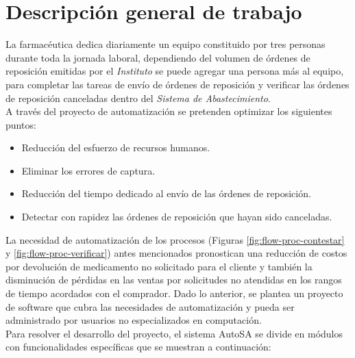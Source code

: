\section{Descripción general de trabajo}\label{sec:desc-general}
La farmacéutica dedica diariamente un equipo constituido por tres personas durante toda la jornada laboral, dependiendo del volumen de órdenes de reposición emitidas por el \textit{Instituto} se puede agregar una persona más al equipo, para completar las tareas de envío de órdenes de reposición y verificar las órdenes de reposición canceladas dentro del \textit{Sistema de Abastecimiento}.\\
A través del proyecto de automatización se pretenden optimizar los siguientes puntos:
\begin{itemize}
\item Reducción del esfuerzo de recursos humanos.
\item Eliminar los errores de captura.
\item Reducción del tiempo dedicado al envío de las órdenes de reposición.
\item Detectar con rapidez las órdenes de reposición que hayan sido canceladas.
\end{itemize}
La necesidad de automatización de los procesos (Figuras \ref{fig:flow-proc-contestar} y \ref{fig:flow-proc-verificar}) antes mencionados pronostican una reducción de costos por devolución de medicamento no solicitado para el cliente y también la disminución de pérdidas en las ventas por solicitudes no atendidas en los rangos de tiempo acordados con el comprador. Dado lo anterior, se plantea un proyecto de software que cubra las necesidades de automatización y pueda ser administrado por usuarios no especializados en computación.\\
Para resolver el desarrollo del proyecto, el sistema AutoSA se divide en módulos con funcionalidades específicas que se muestran a continuación:
